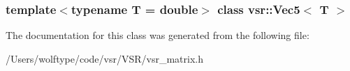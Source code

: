 \subsubsection*{template$<$typename T = double$>$ class vsr\-::\-Vec5$<$ T $>$}



The documentation for this class was generated from the following file\-:\begin{DoxyCompactItemize}
\item 
/\-Users/wolftype/code/vsr/\-V\-S\-R/vsr\-\_\-matrix.\-h\end{DoxyCompactItemize}
